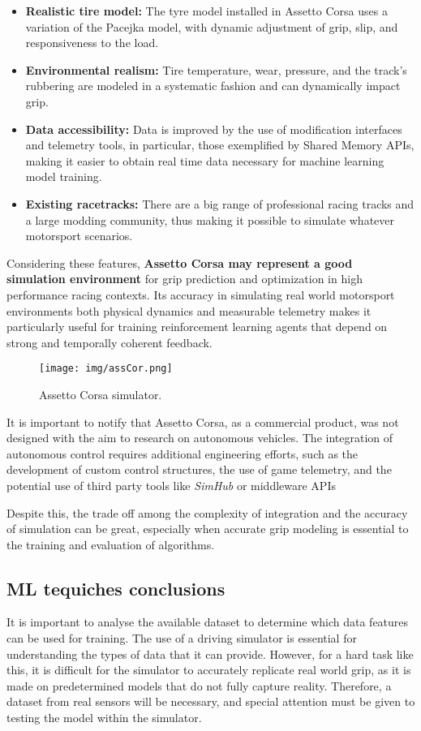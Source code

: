 \documentclass[a4paper,final,12pt]{report}
\begin{document}
\begin{itemize}
    \item \textbf{Realistic tire model:} The tyre model installed in Assetto Corsa uses a variation of the Pacejka model, with dynamic adjustment of grip, slip, and responsiveness to the load.
    \item \textbf{Environmental realism:} Tire temperature, wear, pressure, and the track's rubbering are modeled in a systematic fashion and can dynamically impact grip.
    \item \textbf{Data accessibility:} Data is improved by the use of modification interfaces and telemetry tools, in particular, those exemplified by Shared Memory APIs, making it easier to obtain real time data necessary for machine learning model training.
    \item \textbf{Existing racetracks:} There are a big range of professional racing tracks and a large modding community, thus making it possible to simulate whatever motorsport scenarios.
\end{itemize}

Considering these features, \textbf{Assetto Corsa may represent a good simulation environment} for grip prediction and optimization in high performance racing contexts. Its accuracy in simulating real world motorsport environments both physical dynamics and measurable telemetry makes it particularly useful for training reinforcement learning agents that depend on strong and temporally coherent feedback.

\begin{figure}[hbtp]
\centering
\texttt{[image: img/assCor.png]}
\caption{Assetto Corsa simulator. \cite{assettocorsa2025}}
\label{figura:assCorsa}
\end{figure}

It is important to notify that Assetto Corsa, as a commercial product, was not designed with the aim to research on autonomous vehicles. The integration of autonomous control requires additional engineering efforts, such as the development of custom control structures, the use of game telemetry, and the potential use of third party tools like \textit{SimHub} or middleware APIs \cite{ac_telemetry}

Despite this, the trade off among the complexity of integration and the accuracy of simulation can be great, especially when accurate grip modeling is essential to the training and evaluation of algorithms.

\subsection{ML tequiches conclusions}
It is important to analyse the available dataset to determine which data features can be used for training. The use of a driving simulator is essential for understanding the types of data that it can provide. However, for a hard task like this, it is difficult for the simulator to accurately replicate real world grip, as it is made on predetermined models that do not fully capture reality. Therefore, a dataset from real sensors will be necessary, and special attention must be given to testing the model within the simulator.
\end{document}
